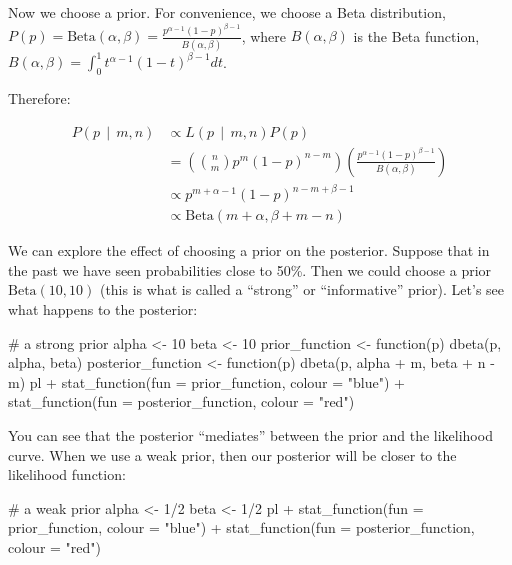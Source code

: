 \documentclass[
  letterpaper,
  DIV=11,
  numbers=noendperiod]{scrreprt}
\newenvironment{Shaded}{\begin{snugshade}}{\end{snugshade}}
\newcommand{\NormalTok}[1]{\textcolor[rgb]{0.00,0.23,0.31}{#1}}
\begin{document}
Now we choose a prior. For convenience, we choose a Beta distribution,
\(P(p) = \text{Beta}(\alpha, \beta) = \frac{p^{\alpha - 1} (1-p)^{\beta - 1}}{B(\alpha, \beta)}\),
where \(B(\alpha, \beta)\) is the Beta function,
\(B(\alpha, \beta) = \int_0^1 t^{\alpha -1} (1-t)^{\beta - 1} dt\).

Therefore:

\[
\begin{aligned}
P(p \ \ \vert \ \ m,n) & \propto L(p \ \ \vert \ \ m,n) P(p) \\
&= \left(\binom{n}{m} p^m (1-p)^{n-m} \right) \left( \frac{p^{\alpha - 1} (1-p)^{\beta - 1}}{B(\alpha, \beta)} \right)\\
& \propto p^{m+\alpha -1} (1-p)^{n-m + \beta -1} \\
& \propto \text{Beta}(m + \alpha, \beta + m - n)
\end{aligned}
\]

We can explore the effect of choosing a prior on the posterior. Suppose
that in the past we have seen probabilities close to 50\%. Then we could
choose a prior \(\text{Beta}(10,10)\) (this is what is called a
``strong'' or ``informative'' prior). Let's see what happens to the
posterior:

\begin{Shaded}
\begin{Highlighting}[]
\NormalTok{\# a strong prior}
\NormalTok{alpha \textless{}{-} 10}
\NormalTok{beta \textless{}{-} 10}
\NormalTok{prior\_function \textless{}{-} function(p) dbeta(p, alpha, beta)}
\NormalTok{posterior\_function \textless{}{-} function(p) dbeta(p, alpha + m, beta + n {-} m)}
\NormalTok{pl + stat\_function(fun = prior\_function, colour = "blue") + }
\NormalTok{  stat\_function(fun = posterior\_function, colour = "red")}
\end{Highlighting}
\end{Shaded}

You can see that the posterior ``mediates'' between the prior and the
likelihood curve. When we use a weak prior, then our posterior will be
closer to the likelihood function:

\begin{Shaded}
\begin{Highlighting}[]
\NormalTok{\# a weak prior}
\NormalTok{alpha \textless{}{-} 1/2}
\NormalTok{beta \textless{}{-} 1/2}
\NormalTok{pl + stat\_function(fun = prior\_function, colour = "blue") + }
\NormalTok{  stat\_function(fun = posterior\_function, colour = "red")}
\end{Highlighting}
\end{Shaded}
\end{document}
